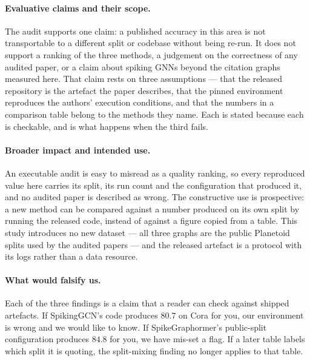 \paragraph{Evaluative claims and their scope.} The audit supports one claim: a published accuracy in
this area is not transportable to a different split or codebase without being re-run. It does not
support a ranking of the three methods, a judgement on the correctness of any audited paper, or a
claim about spiking GNNs beyond the citation graphs measured here. That claim rests on three
assumptions --- that the released repository is the artefact the paper describes, that the pinned
environment reproduces the authors' execution conditions, and that the numbers in a comparison table
belong to the methods they name. Each is stated because each is checkable, and  is
what happens when the third fails.

\paragraph{Broader impact and intended use.} An executable audit is easy to misread as a quality
ranking, so every reproduced value here carries its split, its run count and the configuration that
produced it, and no audited paper is described as wrong. The constructive use is prospective: a new
method can be compared against a number produced on its own split by running the released code,
instead of against a figure copied from a table. This study introduces no new dataset --- all three
graphs are the public Planetoid splits used by the audited papers --- and the released artefact is a
protocol with its logs rather than a data resource.

\paragraph{What would falsify us.} Each of the three findings is a claim that a reader can check
against shipped artefacts. If SpikingGCN's code produces $80.7$ on Cora for you, our environment is
wrong and we would like to know. If SpikeGraphormer's public-split configuration produces $84.8$ for
you, we have mis-set a flag. If a later table labels which split it is quoting, the split-mixing
finding no longer applies to that table.
